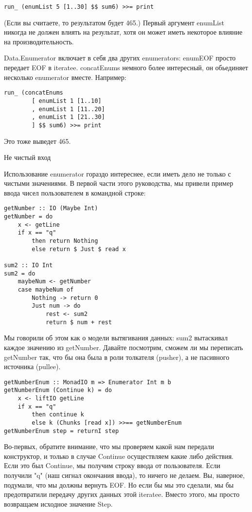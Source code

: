 \begin{lstlisting}
run_ (enumList 5 [1..30] $$ sum6) >>= print
\end{lstlisting}

(Если вы считаете, то результатом будет 465.) Первый аргумент enumList никогда не должен влиять на результат, хотя он может иметь некоторое влияние на производительность.

Data.Enumerator включает в себя два других enumerators: enumEOF просто передает EOF в iteratee. concatEnums немного более интересный, он обьединяет несколько enumerator вместе. Например:

\begin{lstlisting}
run_ (concatEnums
        [ enumList 1 [1..10]
        , enumList 1 [11..20]
        , enumList 1 [21..30]
        ] $$ sum6) >>= print
\end{lstlisting}

Это тоже выведет 465.

Не чистый вход

Использование enumerator гораздо интереснее, если иметь дело не только с чистыми значениями. В первой части этого руководства, мы привели пример ввода чисел пользователем в командной строке:

\begin{lstlisting}
getNumber :: IO (Maybe Int)
getNumber = do
    x <- getLine
    if x == "q"
        then return Nothing
        else return $ Just $ read x

sum2 :: IO Int
sum2 = do
    maybeNum <- getNumber
    case maybeNum of
        Nothing -> return 0
        Just num -> do
            rest <- sum2
            return $ num + rest
\end{lstlisting}

Мы говорили об этом как о модели вытягивания данных: sum2 вытаскивал каждое значению из getNumber. Давайте посмотрим, сможем ли мы переписать getNumber так, что бы она была в роли толкателя (pusher), а не пасивного источника (pullee).

\begin{lstlisting}
getNumberEnum :: MonadIO m => Enumerator Int m b
getNumberEnum (Continue k) = do
    x <- liftIO getLine
    if x == "q"
        then continue k
        else k (Chunks [read x]) >>== getNumberEnum
getNumberEnum step = returnI step
\end{lstlisting}

Во-первых, обратите внимание, что мы проверяем какой нам передали конструктор, и только в случае Continue осуществляем какие либо действия. Если это был Continue, мы получим строку ввода от пользователя. Если получили "q" (наш сигнал окончания ввода), то ничего не делаем. Вы, наверное, подумали, что мы должны вернуть EOF. Но если бы мы это сделали, мы бы предотвратили передачу других данных этой iteratee. Вместо этого, мы просто возвращаем исходное значение Step.

